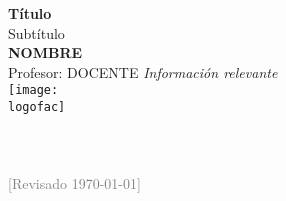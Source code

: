 
\begin{titlepage}
    \begin{center}
        \vspace*{0pt}   
        \Huge
        \textbf{Título}\\
        \vspace{1ex}
        \Large
        Subtítulo \\
        \vspace{5ex}
        \textbf{NOMBRE}\\
        \vspace{.5ex}
        Profesor: DOCENTE
        \vfill
        \large\textit{Información relevante}\\
        \vspace{3ex}
        \texttt{[image: \\logofac]}\\
        \vspace{2ex}
        \large
        \textsc{\carrera}\\
        \textsc{\universidad}\\
        \vspace{.5ex}
        \normalsize \fecha\\
        \footnotesize \textcolor{gray}{[Revisado \today ]}
    \end{center}
\end{titlepage}